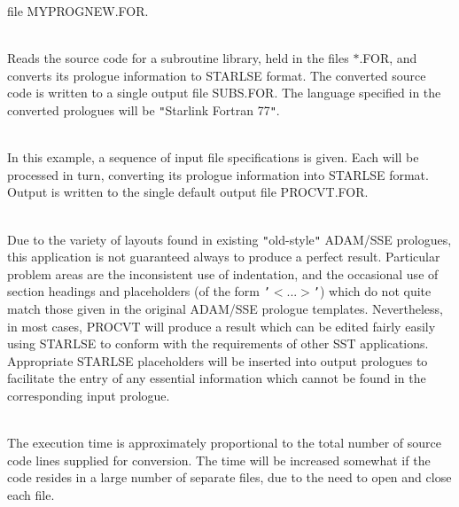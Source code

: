 \documentclass[twoside,11pt]{article}
\renewcommand{\_}{\texttt{\symbol{95}}}
\newlength{\sstexampleslength}
\newcommand{\sstexamplesubsection}[2]{\sloppy
\item[\parbox{\sstexampleslength}{\ssttt #1}] \mbox{} \vspace{1.0ex}
\\ #2 }
\newcommand{\sstnotes}[1]{\item[Notes:] \mbox{} \\[1.3ex] #1}
\newcommand{\sstdiytopic}[2]{\item[{\hspace{-0.35em}#1\hspace{-0.35em}:}]
\mbox{} \\[1.3ex] #2}
\newcommand{\sstexamplesubsection}[2]{\item[{\ssttt #1}] #2}
\newcommand{\sstnotes}[1]{\item[Notes:] #1 }
\newcommand{\sstdiytopic}[2]{\item[{#1}] #2 }
\begin{document}
{{{         file MYPROG\_NEW.FOR.
      }
      \sstexamplesubsection{
         PROCVT $*$.FOR OUT=SUBS.FOR ATASK=FALSE LANG={\tt "}Starlink Fortran 77{\tt "}
      }{
         Reads the source code for a subroutine library, held in the
         files $*$.FOR, and converts its prologue information to STARLSE
         format. The converted source code is written to a single
         output file SUBS.FOR. The language specified in the converted
         prologues will be {\tt "}Starlink Fortran 77{\tt "}.
      }
      \sstexamplesubsection{
         PROCVT IN=[{\tt "}$*$.FOR{\tt "},{\tt "}$*$.GEN{\tt "}] NOATASK
      }{
         In this example, a sequence of input file specifications is
         given. Each will be processed in turn, converting its prologue
         information into STARLSE format. Output is written to the
         single default output file PROCVT.FOR.
      }
   }
   \sstnotes{
      Due to the variety of layouts found in existing {\tt "}old-style{\tt "}
      ADAM/SSE prologues, this application is not guaranteed always to
      produce a perfect result. Particular problem areas are the
      inconsistent use of indentation, and the occasional use of
      section headings and placeholders (of the form {\tt '}$<$...$>${\tt '}) which do
      not quite match those given in the original ADAM/SSE prologue
      templates.  Nevertheless, in most cases, PROCVT will produce a
      result which can be edited fairly easily using STARLSE to conform
      with the requirements of other SST applications. Appropriate
      STARLSE placeholders will be inserted into output prologues to
      facilitate the entry of any essential information which cannot be
      found in the corresponding input prologue.
   }
   \sstdiytopic{
      Timing
   }{
      The execution time is approximately proportional to the total
      number of source code lines supplied for conversion. The time
      will be increased somewhat if the code resides in a large number
      of separate files, due to the need to open and close each file.
   }
}
\newpage
\end{document}
